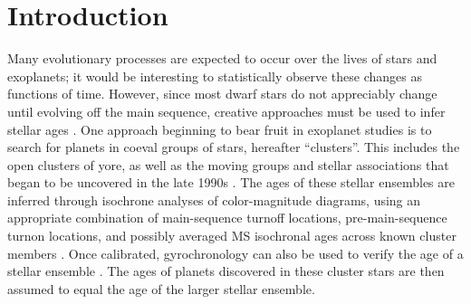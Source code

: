 \documentclass[12pt,twocolumn,tighten]{aastex62}
\begin{document}







\section{Introduction}
\label{sec:intro}

Many evolutionary processes are expected to occur over the lives of
stars and exoplanets; it would be interesting to statistically observe
these changes as functions of time.  However, since most dwarf stars
do not appreciably change until evolving off the
main sequence, creative approaches must be used to infer stellar ages
\citep{soderblom_ages_2010}.  One approach beginning to bear fruit in
exoplanet studies is to search for planets in coeval groups of stars,
hereafter ``clusters''.  This includes the open clusters of yore, as
well as the moving groups and stellar associations that began to be
uncovered in the late 1990s \citep{zuckerman_young_2004}.  The ages of
these stellar ensembles are inferred through isochrone analyses of
color-magnitude diagrams, using an appropriate combination of
main-sequence turnoff locations, pre-main-sequence turnon locations,
and possibly averaged MS isochronal ages across known cluster members
\citep[{\it e.g.},][Section 3.4.3]{kharchenko_global_2012}.  Once
calibrated, gyrochronology can also be used to verify the age of a
stellar ensemble \citep[{\it
e.g.},][]{barnes_color-period_2015,meibom_spin-down_2015,curtis_tess_2019}.
The ages of planets discovered in these cluster stars are then assumed
to equal the age of the larger stellar ensemble.
\end{document}
